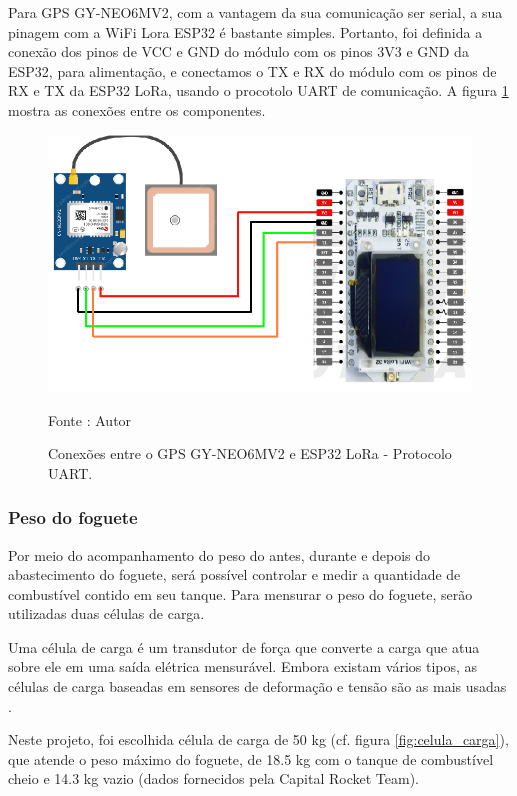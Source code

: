 Para GPS GY-NEO6MV2, com a vantagem da sua comunicação ser serial, a sua pinagem com a WiFi Lora ESP32 é bastante simples. Portanto, foi definida a conexão dos pinos de VCC e GND do módulo com os pinos 3V3 e GND da ESP32, para alimentação, e conectamos o TX e RX do módulo com os pinos de RX e TX da ESP32 LoRa, usando o procotolo UART de comunicação. A figura \ref{fig:PINAGEM_GPS} mostra as conexões entre os componentes.

\begin{figure}[H]
  \centering
  \includegraphics[scale=0.4]{figuras/PINAGEM_GPS.png}
  \caption{Conexões entre o GPS GY-NEO6MV2 e ESP32 LoRa - Protocolo UART.} 
  {\footnotesize Fonte : Autor } 
  \label{fig:PINAGEM_GPS}
\end{figure}


\subsubsection{Peso do foguete}
\label{Peso_do_Foguete}

Por meio do acompanhamento do peso do antes, durante e depois do abastecimento do foguete, será possível controlar e medir a quantidade de combustível contido em seu tanque. Para mensurar o peso do foguete, serão utilizadas duas células de carga. 

Uma célula de carga é um transdutor de força que converte a carga que atua sobre ele em uma saída elétrica mensurável. Embora existam vários tipos, as células de carga baseadas em sensores de deformação e tensão são as mais usadas \cite{omega_celulacarga}. 

Neste projeto, foi escolhida célula de carga de 50 kg (cf. figura \ref{fig:celula_carga}), que atende o peso máximo do foguete, de 18.5 kg com o tanque de combustível cheio e 14.3 kg vazio (dados fornecidos pela Capital Rocket Team).

